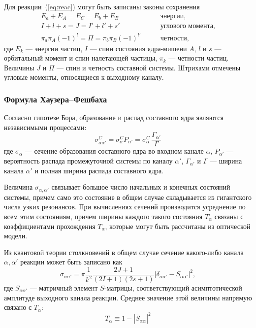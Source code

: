 Для реакции~(\ref{eq:reac}) могут быть записаны законы сохранения
\begin{equation}
\begin{aligned}
E_a + E_A = E_C = E_b + E_B& \qquad \text{энергии,}\\
I + l + s = J = I' + l' + s'& \qquad \text{углового момента,}\\
\pi_a \pi_A (-1)^l = \Pi = \pi_b \pi_B (-1)^{l'}& \qquad \text{четности,}
\end{aligned}
\end{equation}
где $E_k$ --- энергии частиц, $I$ --- спин состояния ядра-мишени $A$, $l$ и $s$ --- орбитальный момент и спин налетающей частицы, $\pi_k$ --- четности частиц. Величины $J$ и $\Pi$ --- спин и четность составной системы. Штрихами отмечены угловые моменты, относящиеся к выходному каналу.

\subsubsection{Формула Хаузера--Фешбаха}
Согласно гипотезе Бора, образование и распад составного ядра являются независимыми процессами:
\begin{equation}
\displaystyle
\sigma^C_{\alpha \alpha'} = \sigma^C_{\alpha}P_{\alpha'} = 
\sigma^C_{\alpha} \, \frac{\Gamma_{\alpha'}}{\Gamma}
\end{equation}
где $\sigma_{\alpha}$ --- сечение образования составного ядра во входном канале $\alpha$, $P_{\alpha'}$ --- вероятность распада промежуточной системы по каналу $\alpha'$, $\Gamma_{\alpha'}$ и $\Gamma$ --- ширина канала $\alpha'$ и полная ширина распада составного ядра.

Величина $\sigma_{\alpha,\alpha'}$ связывает большое число начальных и конечных состояний системы, причем само это состояние в общем случае складывается из гигантского числа узких резонансов. При вычислениях сечений производится усреднение по всем этим состояниям, причем ширины каждого такого состояния $T_\alpha$ связаны с коэффициентами прохождения $T_\alpha$, которые могут быть рассчитаны из оптической модели.

Из квантовой теории столкновений в общем случае сечение какого-либо канала $\alpha, \alpha'$ реакции может быть записано как
\begin{equation}
\displaystyle
\sigma_{\alpha \alpha'} = \pi \frac{1}{k^2} 
\frac{2J + 1}{(2I + 1)(2s + 1)}
|\delta_{\alpha \alpha'} - S_{\alpha \alpha'}|^2,
\end{equation}
где $S_{\alpha \alpha'}$ --- матричный элемент $S$-матрицы, соответствующий асимптотической амплитуде выходного канала реакции. Среднее значение этой величины напрямую связано с $T_\alpha$:
\begin{equation}
\displaystyle
T_\alpha \equiv 1 - |\bar{S}_{\alpha\alpha}|^2
\end{equation}

